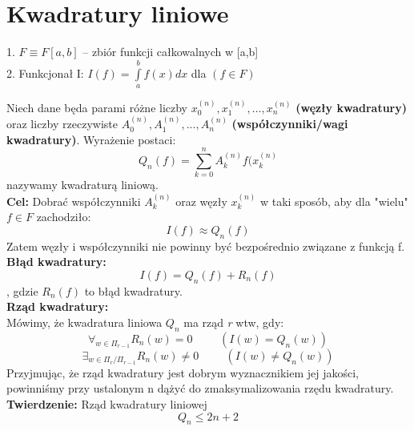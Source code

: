 \documentclass[12pt]{article}
\begin{document}
\section*{Kwadratury liniowe}
\begin{center}
1. $F \equiv F[a,b] $ -- zbiór funkcji całkowalnych w [a,b]\\
2. Funkcjonał I: $I(f) = \int\limits_{a}^{b}f(x)dx$ dla $(f \in F)$
\end{center}
Niech dane będa parami różne liczby $x_0^{(n)}, x_1^{(n)},..., x_n^{(n)} $ \textbf{(węzły kwadratury)} oraz liczby rzeczywiste $A_0^{(n)}, A_1^{(n)},...,A_n^{(n)}$ \textbf{(współczynniki/wagi kwadratury)}. Wyrażenie postaci:
$$ Q_n(f) = \sum_{k=0}^{n} A_k^{(n)}f(x_k^{(n)} $$
nazywamy kwadraturą liniową.\\
\linebreak
\textbf{Cel:} Dobrać współczynniki $A_k^{(n)}$ oraz węzły $x_k^{(n)}$ w taki sposób, aby dla "wielu" $f \in F$ zachodziło:
$$I(f) \approx Q_n(f)$$
Zatem węzły i współczynniki nie powinny być bezpośrednio związane z funkcją f.\\
\linebreak
\textbf{Błąd kwadratury:}\\
$$ I(f) = Q_n(f) + R_n(f)$$,
gdzie $R_n(f)$ to błąd kwadratury.\\
\linebreak
\textbf{Rząd kwadratury:}\\
Mówimy, że kwadratura liniowa $Q_n$ ma rząd \textit{r} wtw, gdy:
$$ \forall_{ w \in \Pi_{r-1}} R_n(w) = 0 \hspace{1cm}(I(w) = Q_n(w))$$ 
$$ \exists_{w \in \Pi_{r}/\Pi_{r-1}} R_n(w) \neq 0 \hspace{1cm}(I(w) \neq Q_n(w))$$  
Przyjmując, że rząd kwadratury jest dobrym wyznacznikiem jej jakości, powinniśmy przy ustalonym n dążyć do zmaksymalizowania rzędu kwadratury.\\
\linebreak
\textbf{Twierdzenie:} Rząd kwadratury liniowej
$$Q_n \le 2n +2 $$
\newpage
\end{document}
